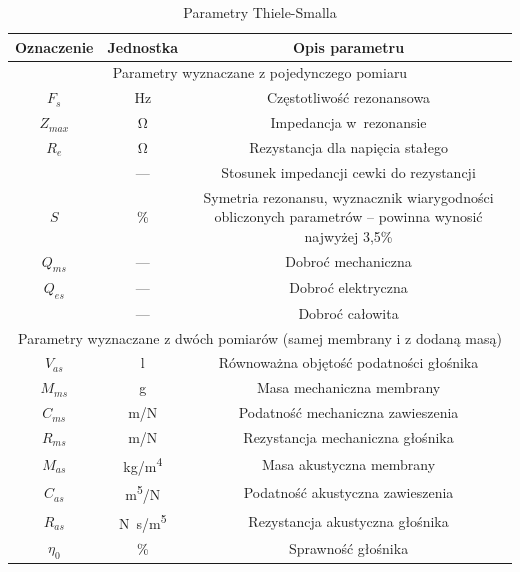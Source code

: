 \documentclass[12pt]{oska}
\begin{document}
			\begin{table}[!ht]
				\centering
				\caption{Parametry Thiele-Smalla}
				\label{t:TS_opis}
				\begin{tabular}{|c|c|c|}
				\hline
					\textbf{Oznaczenie} & \textbf{Jednostka} & \textbf{Opis parametru}\\\hline\hline
					\multicolumn{3}{|c|}{Parametry wyznaczane z pojedynczego pomiaru} \\\hline\hline
					$F_s$ & \si{\Hz} & Częstotliwość rezonansowa \\\hline
					$Z_{max}$ & \si{\ohm} & Impedancja w~rezonansie \\\hline
					$R_e$ & \si{\ohm} & Rezystancja dla napięcia stałego \\\hline
					\gape{$r_0=\frac{Z_{max}}{R_e}$} & --- & Stosunek impedancji cewki do rezystancji \\\hline
					$S$ & \% & \makecell{Symetria rezonansu, wyznacznik wiarygodności\\obliczonych parametrów -- powinna wynosić najwyżej 3,5\%} \\\hline
					\hline
					$Q_{ms}$ & --- & Dobroć mechaniczna \\\hline
					$Q_{es}$ & --- & Dobroć elektryczna \\\hline
					\gape{$Q_{ts}=\frac{Q_{ms}\cdot Q_{es}}{Q_{ms}+Q_{es}}$} & --- & Dobroć całowita \\\hline
					\hline
					\multicolumn{3}{|c|}{Parametry wyznaczane z dwóch pomiarów (samej membrany i z dodaną masą)} \\\hline\hline
					$V_{as}$ & \si{\litre} & Równoważna objętość podatności głośnika \\\hline
					$M_{ms}$ & \si{\gram} & Masa mechaniczna membrany \\\hline
					$C_{ms}$ & \si[per-mode=symbol]{\metre\per\newton} & Podatność mechaniczna zawieszenia \\\hline
					$R_{ms}$ & \si[per-mode=symbol]{\metre\per\newton} & Rezystancja mechaniczna głośnika \\\hline
					\hline
					$M_{as}$ & \si[per-mode=symbol]{\kilo\gram\per\metre\tothe{4}} & Masa akustyczna membrany \\\hline
					$C_{as}$ & \si[per-mode=symbol]{\metre\tothe{5}\per\newton} & Podatność akustyczna zawieszenia \\\hline
					$R_{as}$ & \si[per-mode=symbol]{\newton\s\per\metre\tothe{5}} & Rezystancja akustyczna głośnika \\\hline
					\hline
					$\eta_0$ & \% & Sprawność głośnika \\\hline
				\end{tabular}
			\end{table}
\end{document}
